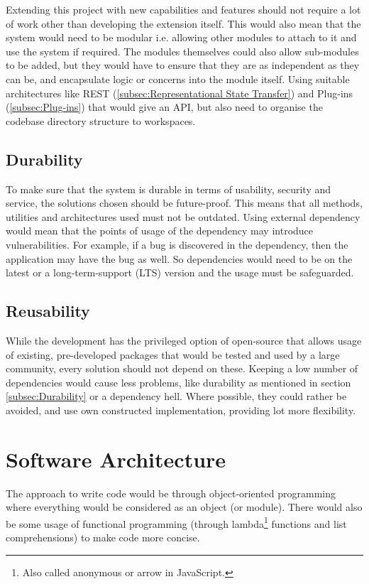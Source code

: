 \documentclass[../main.tex]{subfiles}
\begin{document}
Extending this project with new capabilities and features should not require a lot of work other than developing the extension itself. This would also mean that the system would need to be modular i.e. allowing other modules to attach to it and use the system if required. The modules themselves could also allow sub-modules to be added, but they would have to ensure that they are as independent as they can be, and encapsulate logic or concerns into the module itself. Using suitable architectures like REST (\ref{subsec:Representational State Transfer}) and Plug-ins (\ref{subsec:Plug-ins}) that would give an API, but also need to organise the codebase directory structure to workspaces.

\subsection{Durability}

To make sure that the system is durable in terms of usability, security and service, the solutions chosen should be future-proof. This means that all methods, utilities and architectures used must not be outdated. Using external dependency would mean that the points of usage of the dependency may introduce vulnerabilities. For example, if a bug is discovered in the dependency, then the application may have the bug as well. So dependencies would need to be on the latest or a long-term-support (LTS) version and the usage must be safeguarded.

\subsection{Reusability}

While the development has the privileged option of open-source that allows usage of existing, pre-developed packages that would be tested and used by a large community, every solution should not depend on these. Keeping a low number of dependencies would cause less problems, like durability as mentioned in section \ref{subsec:Durability} or a dependency hell. Where possible, they could rather be avoided, and use own constructed implementation, providing lot more flexibility.

\section{Software Architecture}

The approach to write code would be through object-oriented programming where everything would be considered as an object (or module). There would also be some usage of functional programming (through lambda\footnote{Also called anonymous or arrow in JavaScript.} functions and list comprehensions) to make code more concise.
\end{document}
